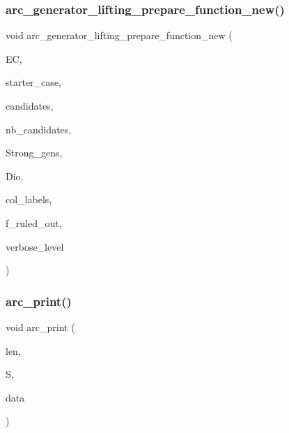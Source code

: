 \subsubsection{\texorpdfstring{arc\+\_\+generator\+\_\+lifting\+\_\+prepare\+\_\+function\+\_\+new()}{arc\_generator\_lifting\_prepare\_function\_new()}}
{\footnotesize\ttfamily void arc\+\_\+generator\+\_\+lifting\+\_\+prepare\+\_\+function\+\_\+new (\begin{DoxyParamCaption}\item[{\mbox{\hyperlink{classexact__cover}{exact\+\_\+cover}} $\ast$}]{EC,  }\item[{\mbox{\hyperlink{galois_8h_a09fddde158a3a20bd2dcadb609de11dc}{I\+NT}}}]{starter\+\_\+case,  }\item[{\mbox{\hyperlink{galois_8h_a09fddde158a3a20bd2dcadb609de11dc}{I\+NT}} $\ast$}]{candidates,  }\item[{\mbox{\hyperlink{galois_8h_a09fddde158a3a20bd2dcadb609de11dc}{I\+NT}}}]{nb\+\_\+candidates,  }\item[{\mbox{\hyperlink{classstrong__generators}{strong\+\_\+generators}} $\ast$}]{Strong\+\_\+gens,  }\item[{\mbox{\hyperlink{classdiophant}{diophant}} $\ast$\&}]{Dio,  }\item[{\mbox{\hyperlink{galois_8h_a09fddde158a3a20bd2dcadb609de11dc}{I\+NT}} $\ast$\&}]{col\+\_\+labels,  }\item[{\mbox{\hyperlink{galois_8h_a09fddde158a3a20bd2dcadb609de11dc}{I\+NT}} \&}]{f\+\_\+ruled\+\_\+out,  }\item[{\mbox{\hyperlink{galois_8h_a09fddde158a3a20bd2dcadb609de11dc}{I\+NT}}}]{verbose\+\_\+level }\end{DoxyParamCaption})}

\mbox{\label{arc__generator_8_c_a8e0ca684a5ab16e4056254023c36455c}} 
\subsubsection{\texorpdfstring{arc\+\_\+print()}{arc\_print()}}
{\footnotesize\ttfamily void arc\+\_\+print (\begin{DoxyParamCaption}\item[{\mbox{\hyperlink{galois_8h_a09fddde158a3a20bd2dcadb609de11dc}{I\+NT}}}]{len,  }\item[{\mbox{\hyperlink{galois_8h_a09fddde158a3a20bd2dcadb609de11dc}{I\+NT}} $\ast$}]{S,  }\item[{void $\ast$}]{data }\end{DoxyParamCaption})}

